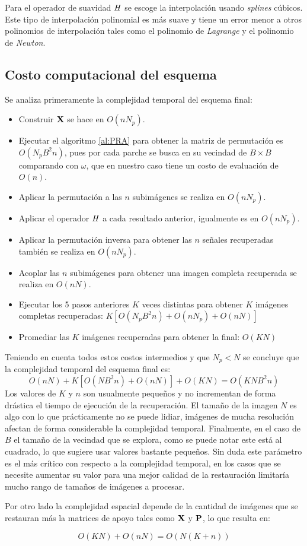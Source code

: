 Para el operador de suavidad $\H$ se escoge la interpolaci\'on usando \textit{splines} c\'ubicos. Este tipo de interpolaci\'on polinomial es m\'as suave y tiene un error menor a otros polinomios de interpolaci\'on tales como el polinomio de \textit{Lagrange} y el polinomio de \textit{Newton}.

\subsection{Costo computacional del esquema}

Se analiza primeramente la complejidad temporal del esquema final:

\begin{itemize}
	\item Construir $\X$ se hace en $O(nN_p)$.
	\item Ejecutar el algoritmo \ref{al:PRA} para obtener la matriz de permutaci\'on es $O(N_pB^2n)$, pues por cada parche se busca en su vecindad de $B \times B$ comparando con $\omega$, que en nuestro caso tiene un costo de evaluaci\'on de $O(n)$.
	\item Aplicar la permutaci\'on a las $n$ subim\'agenes se realiza en $O(nN_p)$.
	\item Aplicar el operador $\H$ a cada resultado anterior, igualmente es en $O(nN_p)$.
	\item Aplicar la permutaci\'on inversa para obtener las $n$ señales recuperadas también se realiza en $O(nN_p)$.
	\item Acoplar las $n$ subim\'agenes para obtener una imagen completa recuperada se realiza en $O(nN)$.
	\item Ejecutar los 5 pasos anteriores $K$ veces distintas para obtener $K$ im\'agenes completas recuperadas: $K[O(N_pB^2n) + O(nN_p) + O(nN)]$
	\item Promediar las $K$ im\'agenes recuperadas para obtener la final: $O(KN)$
\end{itemize}

Teniendo en cuenta todos estos costos intermedios y que $N_p < N$ se concluye que la complejidad temporal del esquema final es:
\begin{equation}
	O(nN) + K[O(NB^2n) + O(nN)] + O(KN) = \boxed{O(KNB^2n)}
	\label{eq:temporal_complexity}
\end{equation}
Los valores de $K$ y $n$ son usualmente pequeños y no incrementan de forma drástica el tiempo de ejecuci\'on de la recuperaci\'on. El tamaño de la imagen $N$ es algo con lo que pr\'acticamente no se puede lidiar, im\'agenes de mucha resoluci\'on afectan de forma considerable la complejidad temporal. Finalmente, en el caso de $B$ el tamaño de la vecindad que se explora, como se puede notar este est\'a al cuadrado, lo que sugiere usar valores bastante pequeños. Sin duda este par\'ametro es el m\'as cr\'itico con respecto a la complejidad temporal, en los casos que se necesite aumentar su valor para una mejor calidad de la restauraci\'on limitar\'ia mucho rango de tamaños de im\'agenes a procesar.

Por otro lado la complejidad espacial depende de la cantidad de im\'agenes que se restauran m\'as la matrices de apoyo tales como $\X$ y $\P$, lo que resulta en:

\begin{equation}
	O(KN) + O(nN) = \boxed{O(N(K + n))}
	\label{eq:spacial_complexity}
\end{equation}